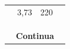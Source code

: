 \begin{table}[H]
\begin{tabular}{lccl}
                                                                                    & 3,73                                                                  & 220                                                           &                                                                                                                                                                                               \\
                                                                                    &                                                                       &                                                               &                                                                                                                                                                                               \\
                                                                                    &                                                                       &                                                               &                                                                                                                                                                                               \\
                                                                                    &                                                                       &                                                               &                                                                                                                                                                                               \\ \hline
    \multicolumn{4}{c}{\textbf{Continua}}                                                                                                                                                                                                                                                                                                                                                                                   \\ \hline
\end{tabular}
\end{table} \pagebreak

